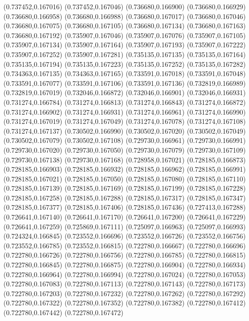 (0.737452,0.167016)
(0.737452,0.167046)
(0.736680,0.166900)
(0.736680,0.166929)
(0.736680,0.166958)
(0.736680,0.166988)
(0.736680,0.167017)
(0.736680,0.167046)
(0.736680,0.167075)
(0.736680,0.167105)
(0.736680,0.167134)
(0.736680,0.167163)
(0.736680,0.167192)
(0.735907,0.167046)
(0.735907,0.167076)
(0.735907,0.167105)
(0.735907,0.167134)
(0.735907,0.167164)
(0.735907,0.167193)
(0.735907,0.167222)
(0.735907,0.167252)
(0.735907,0.167281)
(0.735135,0.167135)
(0.735135,0.167164)
(0.735135,0.167194)
(0.735135,0.167223)
(0.735135,0.167252)
(0.735135,0.167282)
(0.734363,0.167135)
(0.734363,0.167165)
(0.733591,0.167018)
(0.733591,0.167048)
(0.733591,0.167077)
(0.733591,0.167106)
(0.733591,0.167136)
(0.732819,0.166989)
(0.732819,0.167019)
(0.732046,0.166872)
(0.732046,0.166901)
(0.732046,0.166931)
(0.731274,0.166784)
(0.731274,0.166813)
(0.731274,0.166843)
(0.731274,0.166872)
(0.731274,0.166902)
(0.731274,0.166931)
(0.731274,0.166961)
(0.731274,0.166990)
(0.731274,0.167019)
(0.731274,0.167049)
(0.731274,0.167078)
(0.731274,0.167108)
(0.731274,0.167137)
(0.730502,0.166990)
(0.730502,0.167020)
(0.730502,0.167049)
(0.730502,0.167079)
(0.730502,0.167108)
(0.729730,0.166961)
(0.729730,0.166991)
(0.729730,0.167020)
(0.729730,0.167050)
(0.729730,0.167079)
(0.729730,0.167109)
(0.729730,0.167138)
(0.729730,0.167168)
(0.728958,0.167021)
(0.728185,0.166873)
(0.728185,0.166903)
(0.728185,0.166932)
(0.728185,0.166962)
(0.728185,0.166991)
(0.728185,0.167021)
(0.728185,0.167050)
(0.728185,0.167080)
(0.728185,0.167110)
(0.728185,0.167139)
(0.728185,0.167169)
(0.728185,0.167199)
(0.728185,0.167228)
(0.728185,0.167258)
(0.728185,0.167288)
(0.728185,0.167317)
(0.728185,0.167347)
(0.728185,0.167377)
(0.728185,0.167406)
(0.728185,0.167436)
(0.727413,0.167288)
(0.726641,0.167140)
(0.726641,0.167170)
(0.726641,0.167200)
(0.726641,0.167229)
(0.726641,0.167259)
(0.725869,0.167111)
(0.725097,0.166963)
(0.725097,0.166993)
(0.724324,0.166845)
(0.723552,0.166696)
(0.723552,0.166726)
(0.723552,0.166756)
(0.723552,0.166785)
(0.723552,0.166815)
(0.722780,0.166667)
(0.722780,0.166696)
(0.722780,0.166726)
(0.722780,0.166756)
(0.722780,0.166785)
(0.722780,0.166815)
(0.722780,0.166845)
(0.722780,0.166875)
(0.722780,0.166904)
(0.722780,0.166934)
(0.722780,0.166964)
(0.722780,0.166994)
(0.722780,0.167024)
(0.722780,0.167053)
(0.722780,0.167083)
(0.722780,0.167113)
(0.722780,0.167143)
(0.722780,0.167173)
(0.722780,0.167203)
(0.722780,0.167232)
(0.722780,0.167262)
(0.722780,0.167292)
(0.722780,0.167322)
(0.722780,0.167352)
(0.722780,0.167382)
(0.722780,0.167412)
(0.722780,0.167442)
(0.722780,0.167472)
